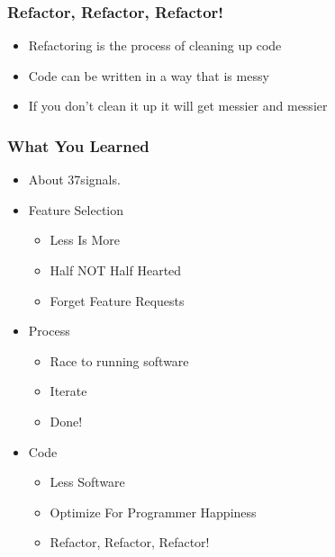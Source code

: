\documentclass[10pt]{beamer}
\begin{document}
\begin{frame}
  \frametitle{Refactor, Refactor, Refactor!}
  \begin{itemize}
    \item Refactoring is the process of cleaning up code
    \pause
    \item Code can be written in a way that is messy
    \pause
    \item If you don't clean it up it will get messier and messier
  \end{itemize}
\end{frame}
\begin{frame}
  \frametitle{What You Learned}
  \pause
  \begin{itemize}
  \item About 37signals.
  \pause
  \item Feature Selection
    \begin{itemize}
    \item Less Is More
    \item Half NOT Half Hearted
    \item Forget Feature Requests
    \end{itemize}
  \pause
  \item Process
    \begin{itemize}
    \item Race to running software
    \item Iterate
    \item Done!
    \end{itemize}
  \pause
  \item Code
    \begin{itemize}
    \item Less Software
    \item Optimize For Programmer Happiness
    \item Refactor, Refactor, Refactor!
    \end{itemize}
  \end{itemize}
\end{frame}
\end{document}
